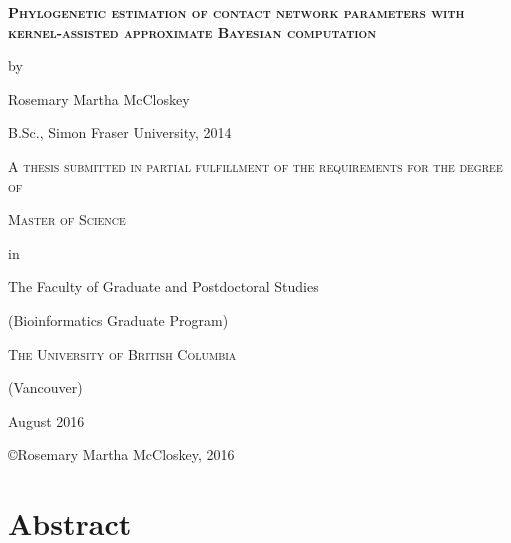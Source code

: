 



\newcommand{\titlesize}{\Large}
\newcommand{\subtitlesize}{\large}
\newcommand{\titlebigsep}{1.25cm}
\newcommand{\titlesmallsep}{0.75cm}
\begin{titlepage}
  \centering
  {\scshape\titlesize\bfseries Phylogenetic estimation of contact network parameters
  with kernel-assisted approximate Bayesian computation \par}
  \vspace{\titlesmallsep}
  {\subtitlesize by\par}
  \vspace{\titlesmallsep}
  {\subtitlesize Rosemary Martha McCloskey \par}
  \vspace{\titlesmallsep}
  {\subtitlesize B.Sc., Simon Fraser University, 2014 \par}
  \vspace{\titlebigsep}
  {\scshape\subtitlesize A thesis submitted in partial fulfillment of the requirements
  for the degree of \par}
  \vspace{\titlesmallsep}
  {\scshape\subtitlesize Master of Science \par}
  \vspace{\titlesmallsep}
  {\subtitlesize in \par}
  \vspace{\titlesmallsep}
  {\subtitlesize The Faculty of Graduate and Postdoctoral Studies \par}
  \vspace{\titlesmallsep}
  {\subtitlesize (Bioinformatics Graduate Program) \par}
  \vspace{\titlebigsep}
  {\scshape \subtitlesize The University of British Columbia \par}
  {\subtitlesize (Vancouver) \par}
  \vspace{\titlesmallsep}
  {\subtitlesize August 2016 \par}
  \vfill
  {\subtitlesize\copyright Rosemary Martha McCloskey, 2016\par}
\end{titlepage}

\setcounter{page}{2}
\chapter*{Abstract}

\newpage

